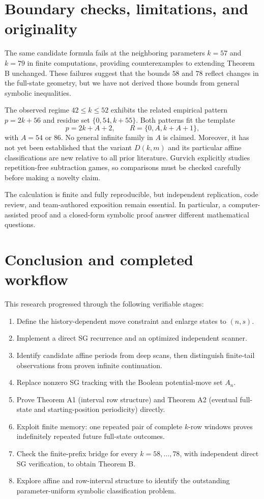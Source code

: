 \documentclass[11pt]{article}
\begin{document}
\section{Boundary checks, limitations, and originality}
The same candidate formula fails at the neighboring parameters
$k=57$ and $k=79$ in finite computations, providing counterexamples
to extending Theorem B unchanged.  These failures suggest that the
bounds $58$ and $78$ reflect changes in the full-state geometry, but
we have not derived those bounds from general symbolic inequalities.

The observed regime $42\le k\le52$ exhibits the related empirical pattern
$p=2k+56$ and residue set $\{0,54,k+55\}$.  Both patterns fit the template
\[
p=2k+A+2,\qquad R=\{0,A,k+A+1\},
\]
with $A=54$ or $86$.  No general infinite family in $A$ is claimed.
Moreover, it has not yet been established that the variant $D(k,m)$ and
its particular affine classifications are new relative to all prior
literature.  Gurvich \cite{gurvich2012} explicitly studies
repetition-free subtraction games, so comparisons must be checked
carefully before making a novelty claim.

The calculation is finite and fully reproducible, but independent
replication, code review, and team-authored exposition remain essential.
In particular, a computer-assisted proof and a closed-form symbolic proof
answer different mathematical questions.

\section{Conclusion and completed workflow}
This research progressed through the following verifiable stages:
\begin{enumerate}
\item Define the history-dependent move constraint and enlarge states to $(n,s)$.
\item Implement a direct SG recurrence and an optimized independent scanner.
\item Identify candidate affine periods from deep scans, then distinguish
finite-tail observations from proven infinite continuation.
\item Replace nonzero SG tracking with the Boolean potential-move set $A_n$.
\item Prove Theorem A1 (interval row structure) and Theorem A2 (eventual
full-state and starting-position periodicity) directly.
\item Exploit finite memory: one repeated pair of complete $k$-row
windows proves indefinitely repeated future full-state outcomes.
\item Check the finite-prefix bridge for every $k=58,\ldots,78$, with
independent direct SG verification, to obtain Theorem B.
\item Explore affine and row-interval structure to identify the outstanding
parameter-uniform symbolic classification problem.
\end{enumerate}
\end{document}
